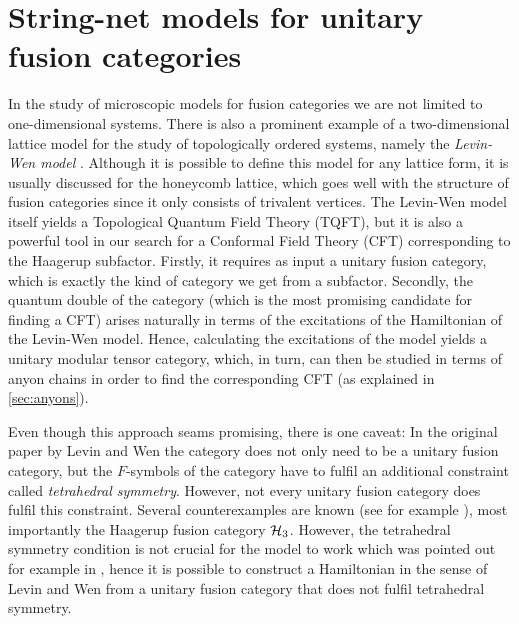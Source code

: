 \chapter{String-net models for unitary fusion categories}
\label{ch:LW}

In the study of microscopic models for fusion categories we are not limited to one-dimensional systems. There is also a prominent example of a two-dimensional lattice model for the study of topologically ordered systems, namely the \emph{Levin-Wen model} \cite{Levin2005}. Although it is possible to define this model for any lattice form, it is usually discussed for the honeycomb lattice, which goes well with the structure of fusion categories since it only consists of trivalent vertices. The Levin-Wen model itself yields a Topological Quantum Field Theory (TQFT), but it is also a powerful tool in our search for a Conformal Field Theory (CFT) corresponding to the Haagerup subfactor.  Firstly, it requires as input a unitary fusion category, which is exactly the kind of category we get from a subfactor. Secondly, the quantum double of the category (which is the most promising candidate for finding a CFT) arises naturally in terms of the excitations of the Hamiltonian of the Levin-Wen model. Hence, calculating the excitations of the model yields a unitary modular tensor category, which, in turn, can then be studied in terms of anyon chains in order to find the corresponding CFT (as explained in \cref{sec:anyons}).

Even though this approach seams promising, there is one caveat: In the original paper by Levin and Wen the category does not only need to be a unitary fusion category, but the $F$-symbols of the category have to fulfil an additional constraint called \emph{tetrahedral symmetry}. However, not every unitary fusion category does fulfil this constraint. Several counterexamples are known (see for example \cite{Hong2009}), most importantly the Haagerup fusion category ${\mathcal{H}_3}$. However, the tetrahedral symmetry condition is not crucial for the model to work which was pointed out for example in \cite{Hong2009}, hence it is possible to construct a Hamiltonian in the sense of Levin and Wen from a unitary fusion category that does not fulfil tetrahedral symmetry.

